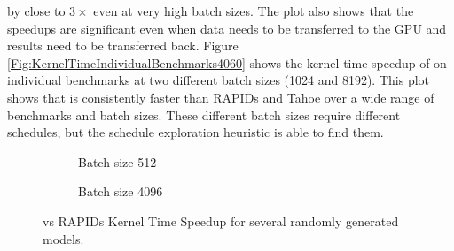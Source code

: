 by close to $3\times$ even at very high batch sizes. The plot also shows that the speedups are significant 
even when data needs to be transferred to the GPU and results need to be transferred back.
Figure \ref{Fig:KernelTimeIndividualBenchmarks4060} shows the kernel time speedup 
of \Treebeard{} on individual benchmarks at two different batch sizes (1024 and 8192). This plot 
shows that \Treebeard{} is consistently faster than RAPIDs and Tahoe over a wide range of benchmarks
and batch sizes. These different batch sizes require different schedules, but the \Treebeard{} 
schedule exploration heuristic is able to find them.
\begin{figure}[ht]
  \centering
  \begin{subfigure}[b]{.45\textwidth}
    \caption{Batch size 512}

  \end{subfigure}
  \begin{subfigure}[b]{.45\textwidth}
    \caption{Batch size 4096}
  \end{subfigure}
  \hfill
  \caption{\label{fig:randomModels4060}\Treebeard{} vs RAPIDs Kernel Time Speedup for several randomly generated models.}
\end{figure}

